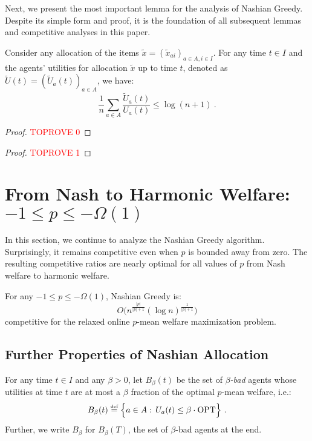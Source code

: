 \documentclass[11pt,letterpaper]{article}
\newcommand{\OPT}{\mathrm{OPT}}
\newcommand{\utility}{U}
\newcommand{\defeq}{\stackrel{\textrm{\tiny def}}{=}}
\begin{document}
Next, we present the most important lemma for the analysis of Nashian Greedy.
Despite its simple form and proof, it is the foundation of all subsequent lemmas and competitive analyses in this paper.



\begin{lemma}
	\label{lem:nashian}
	Consider any allocation of the items $\tilde{x} = (\tilde{x}_{ai})_{a \in A, i \in I}$.
	For any time $t \in I$ and the agents' utilities for allocation $\tilde{x}$ up to time $t$, denoted as $\tilde{\utility}(t) = (\tilde{\utility}_a(t))_{a \in A}$, we have:
	\[
		\frac{1}{n} \sum_{a \in A} \frac{\tilde{\utility}_a(t)}{\utility_a(t)} \le \log (n+1)
		~.
	\]
\end{lemma}

\begin{proof}\textcolor{red}{TOPROVE 0}\end{proof}


\begin{proof}\textcolor{red}{TOPROVE 1}\end{proof}
 \section[From Nash to Harmonic Welfare]{From Nash to Harmonic Welfare: $-1 \le p \le - \Omega(1)$}
\label{sec:nash-to-harmonic}

In this section, we  continue to analyze the Nashian Greedy algorithm.
Surprisingly, it remains competitive even when $p$ is bounded away from zero.
The resulting competitive ratios are nearly optimal for all values of $p$ from Nash welfare to harmonic welfare.

\begin{theorem}
	\label{thm:nashian-to-harmonic}
	For any $-1 \le p \le -	\Omega(1)$, Nashian Greedy is:
	\[
		O \Big( n^{\frac{|p|}{|p|+1}} (\log n)^{\frac{1}{|p|+1}} \Big)
	\]
	competitive for the relaxed online $p$-mean welfare maximization problem.
\end{theorem}


\subsection{Further Properties of Nashian Allocation}

\begin{definition}
\label{def:bad}
	For any time $t\in I$ and any $\beta > 0$, let $B_\beta(t)$ be the set of \emph{$\beta$-bad} agents whose utilities at time $t$ are at most a $\beta$ fraction of the optimal $p$-mean welfare, i.e.:
	\[
	    B_{\beta}(t) \defeq \Big\{a\in A:\,\utility_a(t) \leq \beta \cdot \OPT \Big\}
	    ~.
	\]
	Further, we write $B_\beta$ for $B_\beta(T)$, the set of $\beta$-bad agents at the end.
\end{definition}
\end{document}
